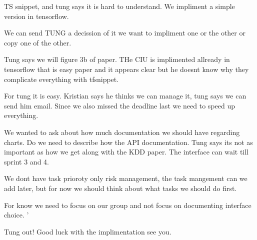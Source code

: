 TS snippet, and tung says it is hard to understand. We impliment a simple version in tensorflow. 

We can send TUNG a decission of it we want to impliment one or the other or copy one of the other.

Tung says we will figure 3b of paper. THe CIU is implimented allready in tensorflow that is easy paper and it appears clear but he doesnt know why they complicate everything with  tfsnippet.

For tung it is easy. Kristian says he thinks we can manage it, tung says we can send him email.
Since we also missed the deadline last we need to speed up everything.


We wanted to ask about how much documentation we should have regarding charts. Do we need to describe how the API documentation. Tung says its not as important as how we get along with the KDD paper. The interface can wait till sprint 3 and 4.

We dont have task prioroty only risk management, the task mangement can we add later, but for now we should think about what tasks we should do first. 

For know we need to focus on our group and not focus on documenting interface choice. '

Tung out! Good luck with the implimentation see you.